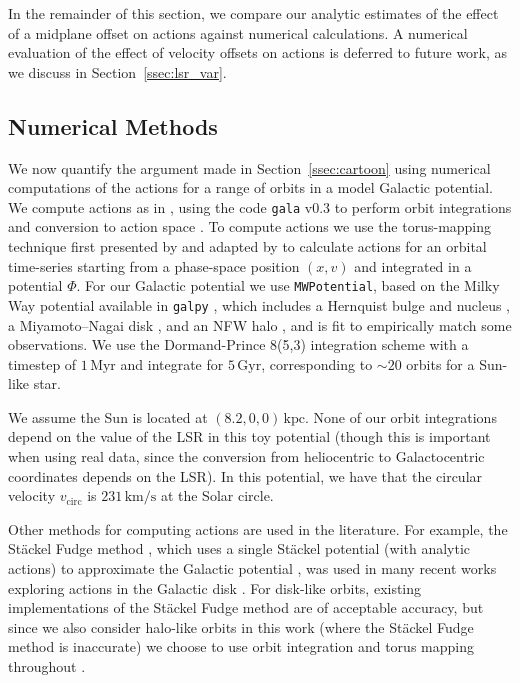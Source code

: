 \documentclass[twocolumn]{aastex62}
\newcommand{\kpc}{\text{kpc}}
\newcommand{\Myr}{\text{Myr}}
\newcommand{\Gyr}{\text{Gyr}}
\newcommand{\kms}{\text{km}/\text{s}}
\begin{document}
In the remainder of this section, we compare our analytic estimates of the
effect of a midplane offset on actions against numerical calculations. A
numerical evaluation of the effect of velocity offsets on actions is deferred
to future work, as we discuss in Section~\ref{ssec:lsr_var}.

\subsection{Numerical Methods} \label{ssec:action_comp}
We now quantify the argument made in Section~\ref{ssec:cartoon} using
numerical computations of the actions for a range of orbits in a model
Galactic potential. We compute actions as in \citet{2018ApJ...867...31B},
using the code \texttt{gala} v0.3 to perform orbit integrations and conversion
to action space \citep{2017JOSS....2..388P,Price-Whelan:2018}. To compute
actions we use the torus-mapping technique first presented by
\citet{1990MNRAS.244..634M} and adapted by \citet{2014MNRAS.441.3284S} to
calculate actions for an orbital time-series starting from a phase-space
position $(x, v)$ and integrated in a potential $\Phi$. For our Galactic potential we use \texttt{MWPotential}, based on the Milky Way
potential available in \texttt{galpy} \citep{2015ApJS..216...29B}, which includes a Hernquist bulge and nucleus \citep{1990ApJ...356..359H},
a Miyamoto--Nagai disk \citep{1975PASJ...27..533M}, and an NFW halo
\citep{1997ApJ...490..493N}, and is fit to empirically match some
observations.
We use the Dormand-Prince 8(5,3) integration scheme
\citep{Dormand80:integrator} with a timestep of $1\,\Myr$ and integrate for
$5\,\Gyr$, corresponding to $\sim 20$ orbits for a Sun-like star.

We assume the Sun is located at $(8.2, 0, 0)\,\kpc$. None of our orbit
integrations depend on the value of the LSR in this toy potential (though this
is important when using real data, since the conversion from heliocentric to
Galactocentric coordinates depends on the LSR). In this potential, we have
that the circular velocity $v_{\text{circ}}$ is $231\,\kms$ at the Solar
circle.

Other methods for computing actions are used in the literature. For example,
the St\"ackel Fudge method \citep{2016MNRAS.457.2107S}, which uses a single
St\"ackel potential (with analytic actions) to approximate the Galactic
potential \citep{1985MNRAS.216..273D, 2012MNRAS.426.1324B}, was used in many
recent works exploring actions in the Galactic disk
\citep[e.g.,][]{2019MNRAS.484.3291T, 2018MNRAS.481.4093S, 2018arXiv180803278T}.
For disk-like orbits, existing implementations of the St\"ackel Fudge method
are of acceptable accuracy, but since we also consider halo-like orbits in
this work (where the St\"ackel Fudge method is inaccurate) we choose to use
orbit integration and torus mapping throughout \citep{2016MNRAS.457.2107S}.
\end{document}
